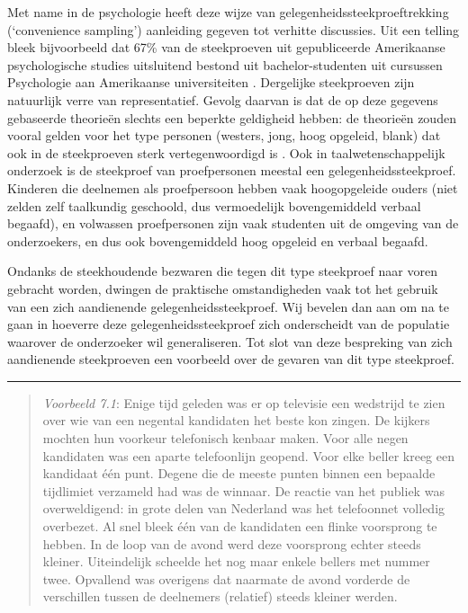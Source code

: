 \documentclass[
]{book}
\begin{document}
Met name in de psychologie heeft deze wijze van
gelegenheidssteekproeftrekking (`convenience sampling') aanleiding
gegeven tot verhitte discussies. Uit een telling bleek bijvoorbeeld dat
67\% van de steekproeven uit gepubliceerde Amerikaanse psychologische
studies uitsluitend bestond uit bachelor-studenten uit cursussen
Psychologie aan Amerikaanse universiteiten \citep{Henr10}. Dergelijke
steekproeven zijn natuurlijk verre van representatief. Gevolg daarvan is
dat de op deze gegevens gebaseerde theorieën slechts een beperkte
geldigheid hebben: de theorieën zouden vooral gelden voor het type
personen (westers, jong, hoog opgeleid, blank) dat ook in de
steekproeven sterk vertegenwoordigd is \citep{Henr10}. Ook in
taalwetenschappelijk onderzoek is de steekproef van proefpersonen
meestal een gelegenheidssteekproef. Kinderen die deelnemen als
proefpersoon hebben vaak hoogopgeleide ouders (niet zelden zelf
taalkundig geschoold, dus vermoedelijk bovengemiddeld verbaal begaafd),
en volwassen proefpersonen zijn vaak studenten uit de omgeving van de
onderzoekers, en dus ook bovengemiddeld hoog opgeleid en verbaal
begaafd.

Ondanks de steekhoudende bezwaren die tegen dit type steekproef naar
voren gebracht worden, dwingen de praktische omstandigheden vaak tot het
gebruik van een zich aandienende gelegenheidssteekproef. Wij bevelen dan
aan om na te gaan in hoeverre deze gelegenheidssteekproef zich
onderscheidt van de populatie waarover de onderzoeker wil generaliseren.
Tot slot van deze bespreking van zich aandienende steekproeven een
voorbeeld over de gevaren van dit type steekproef.

\begin{center}\rule{0.5\linewidth}{0.5pt}\end{center}

\begin{quote}
\emph{Voorbeeld 7.1}: Enige tijd geleden was er op televisie een wedstrijd te zien
over wie
van een negental kandidaten het beste kon zingen. De kijkers mochten hun
voorkeur telefonisch kenbaar maken. Voor alle negen kandidaten was een
aparte telefoonlijn geopend. Voor elke beller kreeg een kandidaat één
punt. Degene die de meeste punten binnen een bepaalde tijdlimiet
verzameld had was de winnaar. De reactie van het publiek was
overweldigend: in grote delen van Nederland was het telefoonnet volledig
overbezet. Al snel bleek één van de kandidaten een flinke voorsprong te
hebben. In de loop van de avond werd deze voorsprong echter steeds
kleiner. Uiteindelijk scheelde het nog maar enkele bellers met nummer
twee. Opvallend was overigens dat naarmate de avond vorderde de
verschillen tussen de deelnemers (relatief) steeds kleiner werden.
\end{quote}
\end{document}

